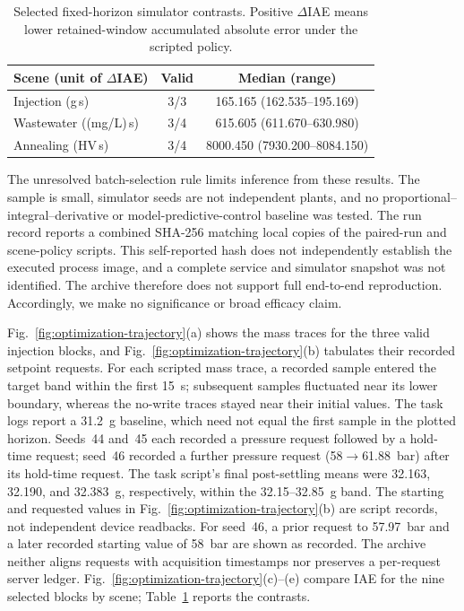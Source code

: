 \documentclass[journal]{IEEEtran}
\begin{document}
\begin{table}[!t]
\centering
\caption{Selected fixed-horizon simulator contrasts. Positive $\Delta$IAE means lower retained-window accumulated absolute error under the scripted policy.}
\label{tab:selected-iae}
\footnotesize
\setlength{\tabcolsep}{3pt}
\begin{tabular}{@{}lcc@{}}
\toprule
Scene (unit of $\Delta$IAE) & Valid & Median (range) \\
\midrule
Injection (g\,s) & 3/3 & 165.165 (162.535--195.169) \\
Wastewater ((mg/L)\,s) & 3/4 & 615.605 (611.670--630.980) \\
Annealing (HV\,s) & 3/4 & 8000.450 (7930.200--8084.150) \\
\bottomrule
\end{tabular}
\end{table}

The unresolved batch-selection rule limits inference from these results. The sample is small, simulator seeds are not independent plants, and no proportional--integral--derivative or model-predictive-control baseline was tested. The run record reports a combined SHA-256 matching local copies of the paired-run and scene-policy scripts. This self-reported hash does not independently establish the executed process image, and a complete service and simulator snapshot was not identified. The archive therefore does not support full end-to-end reproduction. Accordingly, we make no significance or broad efficacy claim.

Fig.~\ref{fig:optimization-trajectory}(a) shows the mass traces for the three valid injection blocks, and Fig.~\ref{fig:optimization-trajectory}(b) tabulates their recorded setpoint requests. For each scripted mass trace, a recorded sample entered the target band within the first 15~s; subsequent samples fluctuated near its lower boundary, whereas the no-write traces stayed near their initial values. The task logs report a 31.2~g baseline, which need not equal the first sample in the plotted horizon. Seeds~44 and~45 each recorded a pressure request followed by a hold-time request; seed~46 recorded a further pressure request (58$\rightarrow$61.88~bar) after its hold-time request. The task script's final post-settling means were 32.163, 32.190, and 32.383~g, respectively, within the 32.15--32.85~g band. The starting and requested values in Fig.~\ref{fig:optimization-trajectory}(b) are script records, not independent device readbacks. For seed~46, a prior request to 57.97~bar and a later recorded starting value of 58~bar are shown as recorded. The archive neither aligns requests with acquisition timestamps nor preserves a per-request server ledger. Fig.~\ref{fig:optimization-trajectory}(c)--(e) compare IAE for the nine selected blocks by scene; Table~\ref{tab:selected-iae} reports the contrasts.
\end{document}
